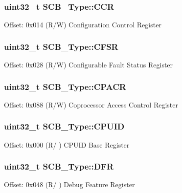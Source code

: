 \subsubsection[{\texorpdfstring{C\+CR}{CCR}}]{ uint32\+\_\+t S\+C\+B\+\_\+\+Type\+::\+C\+CR}\hypertarget{struct_s_c_b___type_a6d273c6b90bad15c91dfbbad0f6e92d8}{}\label{struct_s_c_b___type_a6d273c6b90bad15c91dfbbad0f6e92d8}
Offset\+: 0x014 (R/W) Configuration Control Register 
\subsubsection[{\texorpdfstring{C\+F\+SR}{CFSR}}]{ uint32\+\_\+t S\+C\+B\+\_\+\+Type\+::\+C\+F\+SR}\hypertarget{struct_s_c_b___type_a2f94bf549b16fdeb172352e22309e3c4}{}\label{struct_s_c_b___type_a2f94bf549b16fdeb172352e22309e3c4}
Offset\+: 0x028 (R/W) Configurable Fault Status Register 
\subsubsection[{\texorpdfstring{C\+P\+A\+CR}{CPACR}}]{ uint32\+\_\+t S\+C\+B\+\_\+\+Type\+::\+C\+P\+A\+CR}\hypertarget{struct_s_c_b___type_af460b56ce524a8e3534173f0aee78e85}{}\label{struct_s_c_b___type_af460b56ce524a8e3534173f0aee78e85}
Offset\+: 0x088 (R/W) Coprocessor Access Control Register 
\subsubsection[{\texorpdfstring{C\+P\+U\+ID}{CPUID}}]{ uint32\+\_\+t S\+C\+B\+\_\+\+Type\+::\+C\+P\+U\+ID}\hypertarget{struct_s_c_b___type_afa7a9ee34dfa1da0b60b4525da285032}{}\label{struct_s_c_b___type_afa7a9ee34dfa1da0b60b4525da285032}
Offset\+: 0x000 (R/ ) C\+P\+U\+ID Base Register 
\subsubsection[{\texorpdfstring{D\+FR}{DFR}}]{ uint32\+\_\+t S\+C\+B\+\_\+\+Type\+::\+D\+FR}\hypertarget{struct_s_c_b___type_a586a5225467262b378c0f231ccc77f86}{}\label{struct_s_c_b___type_a586a5225467262b378c0f231ccc77f86}
Offset\+: 0x048 (R/ ) Debug Feature Register 
